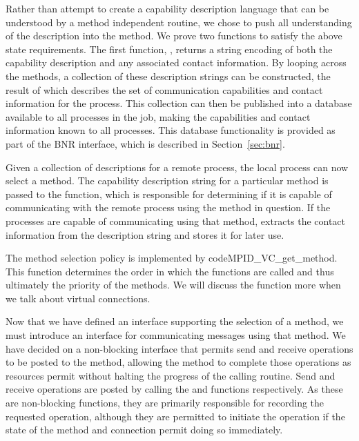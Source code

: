 Rather than attempt to create a capability description language that can be
understood by a method independent routine, we chose to push all understanding
of the description into the method.  We prove two functions to satisfy the
above state requirements.  The first function, ,
returns a string encoding of both the capability description and any associated
contact information.  By looping across the methods, a collection of these
description strings can be constructed, the result of which describes the set
of communication capabilities and contact information for the process.  This
collection can then be published into a database available to all processes in
the job, making the capabilities and contact information known to all
processes.  This database functionality is provided as part of the BNR
interface, which is described in Section~\ref{sec:bnr}.

Given a collection of descriptions for a remote process, the local process can
now select a method.  The capability description string for a particular method
is passed to the  function, which is
responsible for determining if it is capable of communicating with the remote
process using the method in question.  If the processes are capable of
communicating using that method,  extracts the contact
information from the description string and stores it for later use.

The method selection policy is implemented by code{MPID_VC_get_method}.  This
function determines the order in which the 
functions are called and thus ultimately the priority of the methods.  We will
discuss the  function more when we talk about virtual
connections.

Now that we have defined an interface supporting the selection of a method, we
must introduce an interface for communicating messages using that method.  We
have decided on a non-blocking interface that permits send and receive
operations to be posted to the method, allowing the method to complete those
operations as resources permit without halting the progress of the calling
routine.  Send and receive operations are posted by calling the
 and  functions respectively.
As these are non-blocking functions, they are primarily responsible for
recording the requested operation, although they are permitted to initiate the
operation if the state of the method and connection permit doing so
immediately.

